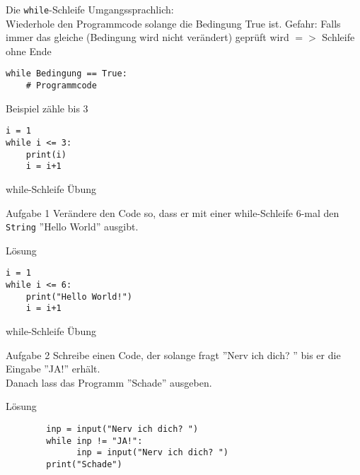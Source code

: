 \begin{frame}[fragile]{Die \texttt{while}-Schleife}
	Umgangssprachlich:\\
	Wiederhole den Programmcode solange die Bedingung True ist.
	Gefahr: Falls immer das gleiche (Bedingung wird nicht verändert) geprüft wird $=>$ Schleife ohne Ende

    \begin{lstlisting}
while Bedingung == True:
    # Programmcode

    \end{lstlisting}
    
    Beispiel zähle bis 3
    \begin{lstlisting}
i = 1
while i <= 3:
    print(i)
    i = i+1   
    \end{lstlisting}
   
\end{frame}

\begin{frame}[fragile]{while-Schleife Übung}
\begin{block}{Aufgabe 1}
	Verändere den Code so, dass er mit einer while-Schleife 6-mal den \texttt{String} ''Hello World'' ausgibt.
\end{block}
\pause{}
\begin{exampleblock}{Lösung}
	\begin{lstlisting}		 
i = 1
while i <= 6:
	print("Hello World!")
	i = i+1   		
	\end{lstlisting}
\end{exampleblock}
\end{frame}

\begin{frame}[fragile]{while-Schleife Übung}
\begin{block}{Aufgabe 2}
	Schreibe einen Code, der solange fragt ''Nerv ich dich? '' bis er die Eingabe ''JA!'' erhält.\\
	Danach lass das Programm ''Schade'' ausgeben.
	
\end{block}
\pause{}
\begin{exampleblock}{Lösung}
	\begin{lstlisting}		 
		inp = input("Nerv ich dich? ")
		while inp != "JA!":
			  inp = input("Nerv ich dich? ")
		print("Schade")	
	\end{lstlisting}
\end{exampleblock}
\end{frame}



